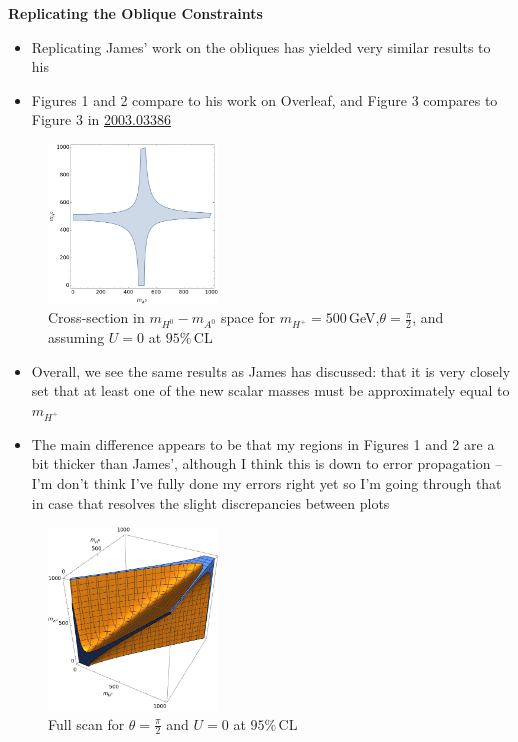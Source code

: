 \documentclass[11pt]{article}
\begin{document}
\thispagestyle{fancy}
{\Large\bfseries Replicating the Oblique Constraints}

\begin{itemize}
    \item Replicating James' work on the obliques has yielded very similar results to his
    \item Figures 1 and 2 compare to his work on Overleaf, and Figure 3 compares to Figure 3 in \href{https://arxiv.org/pdf/2003.03386.pdf}{2003.03386} 
\end{itemize}
\begin{figure}[h]
    \centering
    \includegraphics[width=0.4\textwidth]{oblique2D.png}
    \caption{Cross-section in $m_{H^0}-m_{A^0}$ space for $m_{H^+}=500\,$GeV,$\theta=\frac{\pi}{2}$, and assuming $U=0$ at $95\%\,$CL}
\end{figure}
\begin{itemize}
    \item Overall, we see the same results as James has discussed: that it is very closely set that at least one of the new scalar masses must be approximately equal to $m_{H^+}$
    \item The main difference appears to be that my regions in Figures 1 and 2 are a bit thicker than James', although I think this is down to error propagation -- I'm don't think I've fully done my errors right yet so I'm going through that in case that resolves the slight discrepancies between plots
\end{itemize}
\begin{figure}[h]
    \centering
    \includegraphics[width=0.4\textwidth]{oblique3D.png}
    \caption{Full scan for $\theta=\frac{\pi}{2}$ and $U=0$ at $95\%\,$CL}
\end{figure}
\end{document}
